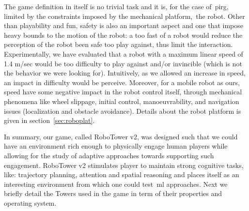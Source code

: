 
The game definition in itself is no trivial task and it is, for the case of~\gls{pirg}, limited by the constraints imposed by the mechanical platform,~\ie the robot. Other than playability and fun, safety is also an important aspect and one that impose heavy bounds to the motion of the robot: a too fast of a robot would reduce the perception of the robot been safe too play against, thus limit the interaction. Experimentally, we have evaluated that a robot with a maximum linear speed of 1.4 m/sec would be too difficulty to play against and/or invincible (which is not the behavior we were looking for). Intuitively, as we allowed an increase in speed, an impact in difficulty would be perceive. Moreover, for a mobile robot as ours, speed have some negative impact in the robot control itself, through mechanical phenomena like wheel slippage, initial control, manoeuvrability, and navigation issues (localization and obstacle avoidance). Details about the robot platform is given in section~\ref{sec:roboplat}.

In summary, our game, called RoboTower v2, was designed such that we could have an environment rich enough to physically engage human players while allowing for the study of adaptive approaches towards supporting such engagement. RoboTower v2 stimulates player to maintain strong cognitive tasks, like: trajectory planning, attention and spatial reasoning and places itself as an interesting environment from which one could test~\gls{ml} approaches. Next we briefly detail the Towers used in the game in term of their properties and operating system.


